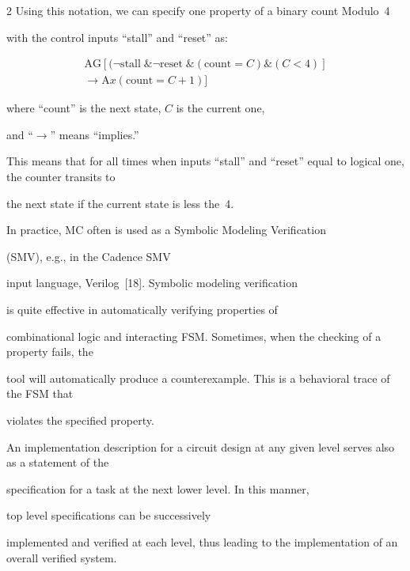 \begin{multicols}{2}
   Using this notation, we can specify one property of a binary count Modulo~4


with the control inputs ``stall''  and ``reset'' as:


\begin{multline*}


\mathrm{AG}[(\lnot \mathrm{stall}\; \&\lnot \mathrm{reset}\;\&


(\mathrm{count}=C)\&(C<4)] \\


{}\rightarrow \mathrm{A}x(\mathrm{count}=C+1)]


\end{multline*}


where ``count'' is the next state, $C$ is the current one,


and ``$\rightarrow$'' means ``implies.''





  This means that for all times when inputs ``stall'' and ``reset'' equal to logical one, the counter transits to


the next state if the current state is less the~4.





   In practice, MC often is used as a Symbolic Modeling Verification


(SMV), e.g., in the Cadence SMV


input language, Verilog~[18]. Symbolic modeling verification


is quite effective in automatically verifying properties of


combinational logic and interacting FSM. Sometimes, when the checking of a property fails, the


tool will automatically produce a counterexample. This is a behavioral trace of the FSM that


violates the specified property.





   An implementation description for a circuit design at any given level serves also as a statement of the


specification for a task at the next lower level. In this manner,


top level specifications can be successively


implemented and verified at each level, thus leading to the implementation of an overall verified system.



\end{multicols}
